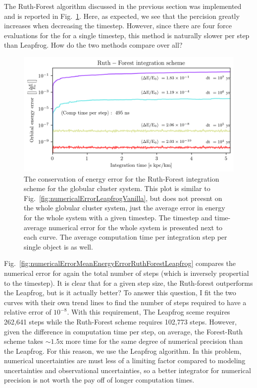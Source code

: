         The Ruth-Forest algorithm discussed in the previous section was implemented and is reported in Fig.~\ref{fig:numericalErrorRuthForest}. Here, as expected, we see that the percision greatly increases when decreasing the timestep. However, since there are four force evaluations for the for a single timestep, this method is naturally slower per step than Leapfrog. How do the two methods compare over all?
        \begin{figure}
            \centering
            \includegraphics[width=\linewidth]{images/numericalErrorRuthForest.png}
            \caption{The conservation of energy error for the Ruth-Forest integration scheme for the globular cluster system. This plot is similar to Fig.~\ref{fig:numericalErrorLeapfrogVanilla}, but does not preesnt on the whole globular cluster system, just the average error in energy for the whole system with a given timestep. The timestep and time-average numerical error for the whole system is presented next to each curve. The average computation time per integration step per single object is as well.}
            \label{fig:numericalErrorRuthForest}
        \end{figure}
        Fig.~\ref{fig:numericalErrorMeanEnergyErrorRuthForestLeapfrog} compares the numerical error for again the total number of steps (which is inversely propertial to the timestep). It is clear that for a given step size, the Ruth-forest outperforms the Leapfrog, but is it actually better? To answer this question, I fit the two curves with their own trend lines to find the number of steps required to have a relative error of $10^{-8}$. With this requirement, The Leapfrog sceme requires 262,641 steps while the Ruth-Forest scheme requires 102,773 steps. However, given the difference in computation time per step, on average, the Forest-Ruth scheme takes $\sim 1.5$x more time for the same degree of numerical precision than the Leapfrog. For this reason, we use the Leapfrog algorithm. In this problem, numerical uncertainties are must less of a limiting factor compared to modeling uncertainties and observational uncertainties, so a better integrator for numerical precision is not worth the pay off of longer computation times. 
